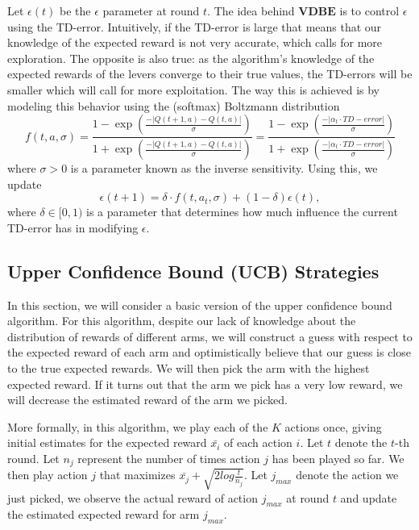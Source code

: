 \documentclass[12pt]{article}
\begin{document}
Let $\epsilon(t)$ be the $\epsilon$ parameter at round $t$.  The idea behind $\textbf{VDBE}$ is to control $\epsilon$ using the TD-error. Intuitively, if the TD-error is large that means that our knowledge of the expected reward is not very accurate, which calls for more exploration. The opposite is also true: as the algorithm's knowledge of the expected rewards of the levers converge to their true values, the TD-errors will be smaller which will call for more exploitation. The way this is achieved is by modeling this behavior using the (softmax) Boltzmann distribution
\begin{equation*}
    f(t, a, \sigma)
    = \frac{1 - \exp(\frac{-|Q(t+1, a) - Q(t,a)|}{\sigma} )}{1 + \exp(\frac{-|Q(t+1, a) - Q(t,a)|}{\sigma} )} 
    = \frac{1 - \exp(\frac{-|\alpha_t \cdot TD-error|}{\sigma} )}{1 + \exp(\frac{-|\alpha_t \cdot TD-error|}{\sigma} )}
\end{equation*}
where $\sigma > 0$ is a parameter known as the inverse sensitivity. Using this, we update
\begin{equation*}
    \epsilon(t+1) = \delta \cdot f(t, a_t, \sigma) + (1-\delta) \epsilon(t),
\end{equation*}
where $\delta \in [0,1)$ is a parameter that determines how much influence the current TD-error has in modifying $\epsilon$. 

\subsection{Upper Confidence Bound (UCB) Strategies}

In this section, we will consider a basic version of the upper confidence bound algorithm\cite{UCB}. For this algorithm, despite our lack of knowledge about the distribution of rewards of different arms, we will construct a guess with respect to the expected reward of each arm and optimistically believe that our guess is close to the true expected rewards. We will then pick the arm with the highest expected reward. If it turns out that the arm we pick has a very low reward, we will decrease the estimated reward of the arm we picked.

More formally, in this algorithm, we play each of the $K$ actions once, giving initial estimates for the expected reward $\bar{x_i}$ of each action $i$. Let $t$ denote the $t$-th round. Let $n_j$ represent the number of times action $j$ has been played so far. We then play action $j$ that maximizes $\bar{x_j} + \sqrt{2log\frac{t}{n_j}}$. Let $j_{max}$ denote the action we just picked, we observe the actual reward of action $j_{max}$ at round $t$ and update the estimated expected reward for arm $j_{max}$.
\end{document}
